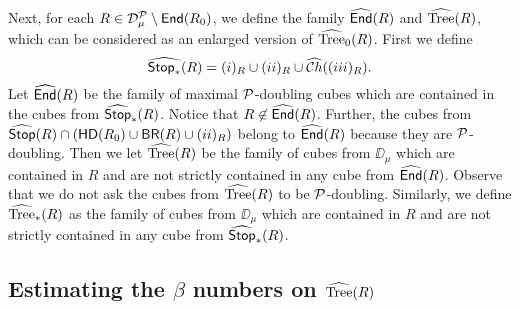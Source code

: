 \vv


Next, for each $R\in{\mathcal D}_\mu^{\mathcal P}\setminus{\mathsf{End}}(R_0)$, we define the family ${\widehat{{\mathsf{End}}}}(R)$ and ${\widehat{{\rm Tree}}}(R)$, which can be considered as an enlarged version of ${\widehat{{\rm Tree}}}_0(R)$.
First we define 
\begin{equation*}
{\widehat{{\mathsf{Stop}}_*}}(R) = (i)_R\cup (ii)_R\cup {\widehat{{\mathcal Ch}}}((iii)_R).
\end{equation*}
Let ${\widehat{{\mathsf{End}}}}(R)$ be the family of maximal ${\mathcal P}$-doubling cubes which are contained in the cubes from ${\widehat{{\mathsf{Stop}}}}_*(R)$.
Notice that $R\not\in{\widehat{{\mathsf{End}}}}(R)$. Further, the cubes from ${\widehat{{\mathsf {Stop}}}}(R)\cap({\mathsf{HD}}(R_0)\cup{\mathsf {BR}}(R)\cup(ii)_R)$
belong to ${\widehat{{\mathsf{End}}}}(R)$ because they are ${\mathcal P}$-doubling.
Then we let ${\widehat{{\rm Tree}}}(R)$ be the family of cubes from $\DD_\mu$ which are contained in $R$ and are not strictly contained in any cube from ${\widehat{{\mathsf{End}}}}(R)$. Observe that we do not ask the cubes from 
${\widehat{{\rm Tree}}}(R)$ to be ${\mathcal P}$-doubling. Similarly, we define ${\widehat{{\rm Tree}}}_*(R)$ as the family of cubes from $\DD_\mu$ which are contained in $R$ and are not strictly contained in any cube from ${\widehat{{\mathsf {Stop}}}}_*(R)$.

\vv
\subsection{Estimating the \texorpdfstring{$\beta$}{beta} numbers on \texorpdfstring{${\widehat{{\rm Tree}}}(R)$}{Tree(R)}}

